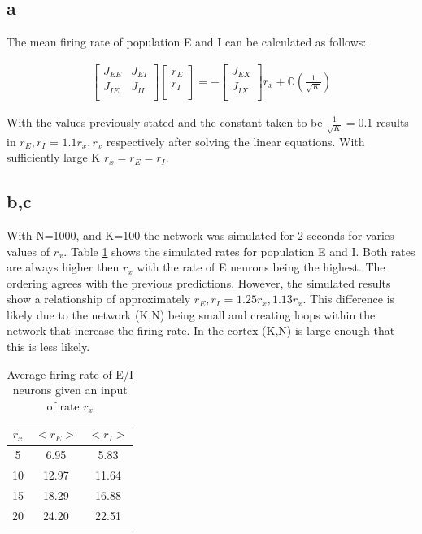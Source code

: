 \documentclass[twoside,twocolumn]{article}
\begin{document}
\subsection{a}
The mean firing rate of population E and I can be calculated as follows:

\begin{gather}
\begin{bmatrix}
J_{EE} & J_{EI}  \\
J_{IE} & J_{II}  \\
\end{bmatrix}
\begin{bmatrix}
r_E  \\
r_I \\
\end{bmatrix}
=
-\begin{bmatrix}
J_{EX}  \\
J_{IX} \\
\end{bmatrix}r_x
+ \mathbb{O}(\frac{1}{\sqrt{K}}) \nonumber 
\end{gather}

With the values previously stated and the constant taken to be $\frac{1}{\sqrt{K}}=0.1$ results in $r_E,r_I$ = $1.1r_x, r_x$ respectively after solving the linear equations. With sufficiently large K $r_x=r_E=r_I$.




\subsection{b,c}
With N=1000, and K=100 the network was simulated for 2 seconds for varies values of $r_x$. Table \ref{tab:r} shows the simulated rates for population E and I. Both rates are always higher then $r_x$ with the rate of E neurons being the highest. The ordering agrees with the previous predictions. However, the simulated results show a relationship of approximately $r_E,r_I$ = $1.25r_x, 1.13r_x$. This difference is likely due to the network (K,N) being small and creating loops within the network that increase the firing rate. In the cortex (K,N) is large enough that this is less likely.

\begin{table}[h]
\centering
\begin{tabular}{ c | c | c }
$r_x$& $<r_E>$ & $<r_I>$ \\ 
\midrule
5&6.95&5.83 \\
10&12.97& 11.64\\
15&18.29&16.88 \\
20&24.20&22.51\\
\end{tabular}
\caption{Average firing rate of E/I neurons given an input of rate $r_x$}
\label{tab:r}
\end{table}
\end{document}
